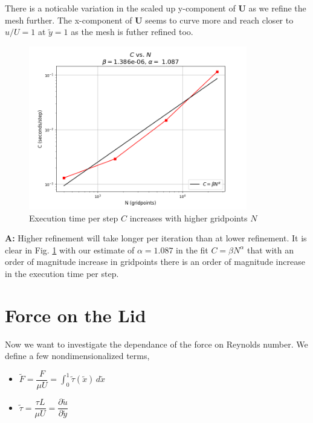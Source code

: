 \documentclass[11pt]{article}
\begin{document}
There is a noticable variation in the scaled up y-component of $\textbf{U}$ as we refine the mesh further. The x-component of $\textbf{U}$ seems to curve more and reach closer to $u/U = 1$ at $\tilde{y}=1$ as the mesh is futher refined too. 

\pagebreak
\begin{figure}[H]
   \centering
   \includegraphics[width=0.85\textwidth]{images/Refinement_Measure.png}
   \caption{Execution time per step $C$ increases with higher gridpoints $N$}
   \label{timerefine}
\end{figure} 

\begin{center} 
\end{center}

\textbf{A:} Higher refinement will take longer per iteration than at lower refinement. It is clear in Fig. \ref{timerefine} with our estimate of $\alpha = 1.087$ in the fit $C = \beta N^{\alpha}$ that with an order of magnitude increase in gridpoints there is an order of magnitude increase in the execution time per step.

\pagebreak

\section{Force on the Lid}
Now we want to investigate the dependance of the force on Reynolds number. We define a few nondimensionalized terms,
\begin{itemize}
   \item $\tilde{F} = \dfrac{F}{\mu U} = \displaystyle \int_{0}^{1} \tilde{\tau}(\tilde{x})\, d\tilde{x}$
   \vspace{2.5mm}

   \item $\tilde{\tau} = \dfrac{\tau L}{\mu U} = \dfrac{\partial\tilde{u}}{\partial\tilde{y}}$
\end{itemize}
\end{document}
